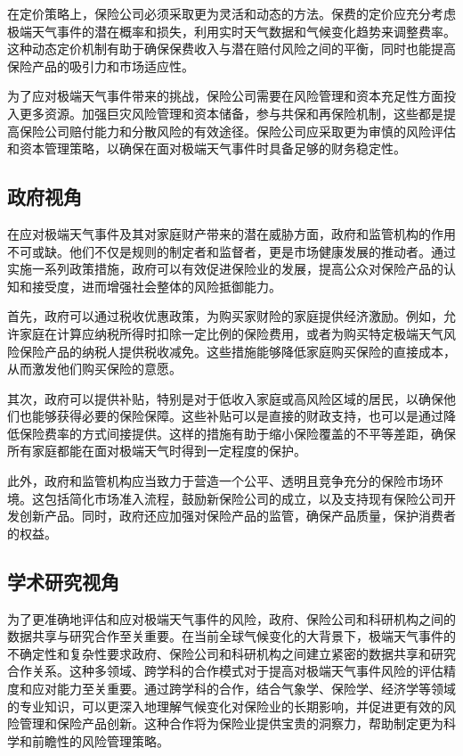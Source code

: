 在定价策略上，保险公司必须采取更为灵活和动态的方法。保费的定价应充分考虑极端天气事件的潜在概率和损失，利用实时天气数据和气候变化趋势来调整费率。这种动态定价机制有助于确保保费收入与潜在赔付风险之间的平衡，同时也能提高保险产品的吸引力和市场适应性。

为了应对极端天气事件带来的挑战，保险公司需要在风险管理和资本充足性方面投入更多资源。加强巨灾风险管理和资本储备，参与共保和再保险机制，这些都是提高保险公司赔付能力和分散风险的有效途径。保险公司应采取更为审慎的风险评估和资本管理策略，以确保在面对极端天气事件时具备足够的财务稳定性。
\subsection{政府视角}


在应对极端天气事件及其对家庭财产带来的潜在威胁方面，政府和监管机构的作用不可或缺。他们不仅是规则的制定者和监督者，更是市场健康发展的推动者。通过实施一系列政策措施，政府可以有效促进保险业的发展，提高公众对保险产品的认知和接受度，进而增强社会整体的风险抵御能力。

首先，政府可以通过税收优惠政策，为购买家财险的家庭提供经济激励。例如，允许家庭在计算应纳税所得时扣除一定比例的保险费用，或者为购买特定极端天气风险保险产品的纳税人提供税收减免。这些措施能够降低家庭购买保险的直接成本，从而激发他们购买保险的意愿。

其次，政府可以提供补贴，特别是对于低收入家庭或高风险区域的居民，以确保他们也能够获得必要的保险保障。这些补贴可以是直接的财政支持，也可以是通过降低保险费率的方式间接提供。这样的措施有助于缩小保险覆盖的不平等差距，确保所有家庭都能在面对极端天气时得到一定程度的保护。

此外，政府和监管机构应当致力于营造一个公平、透明且竞争充分的保险市场环境。这包括简化市场准入流程，鼓励新保险公司的成立，以及支持现有保险公司开发创新产品。同时，政府还应加强对保险产品的监管，确保产品质量，保护消费者的权益。

\subsection{学术研究视角}
为了更准确地评估和应对极端天气事件的风险，政府、保险公司和科研机构之间的数据共享与研究合作至关重要。在当前全球气候变化的大背景下，极端天气事件的不确定性和复杂性要求政府、保险公司和科研机构之间建立紧密的数据共享和研究合作关系。这种多领域、跨学科的合作模式对于提高对极端天气事件风险的评估精度和应对能力至关重要。通过跨学科的合作，结合气象学、保险学、经济学等领域的专业知识，可以更深入地理解气候变化对保险业的长期影响，并促进更有效的风险管理和保险产品创新。这种合作将为保险业提供宝贵的洞察力，帮助制定更为科学和前瞻性的风险管理策略。


